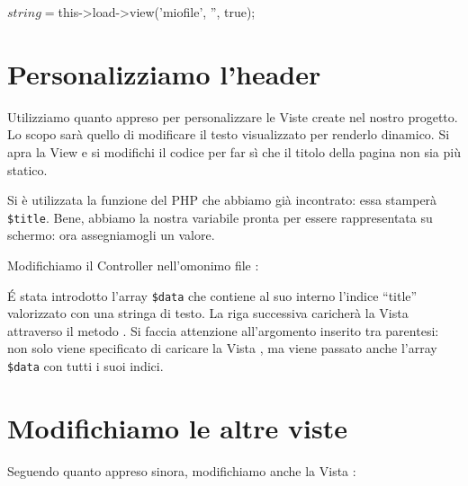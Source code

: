 \begin{code}
$string = $this->load->view('miofile', '', true);
\end{code}

\section{Personalizziamo l'header}
Utilizziamo quanto appreso per personalizzare le Viste create nel nostro progetto. Lo scopo sarà quello di modificare il testo visualizzato per renderlo dinamico. Si apra la View  e si modifichi il codice per far sì che il titolo della pagina non sia più statico.


Si è utilizzata la funzione  del \ac{PHP} che abbiamo già incontrato: essa stamperà \verb|$title|. Bene, abbiamo la nostra variabile pronta per essere rappresentata su schermo: ora assegniamogli un valore.

Modifichiamo il Controller  nell'omonimo file :


\'E stata introdotto l'array \verb|$data| che contiene al suo interno l'indice ``title'' valorizzato con una stringa di testo. La riga successiva caricherà la Vista attraverso il metodo . Si faccia attenzione all'argomento inserito tra parentesi: non solo viene specificato di caricare la Vista , ma viene passato anche l'array \verb|$data| con tutti i suoi indici.

\section*{Modifichiamo le altre viste}
Seguendo quanto appreso sinora, modifichiamo anche la Vista :


